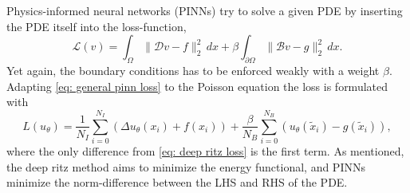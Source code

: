 Physics-informed neural networks (PINNs) try to solve a given PDE by inserting the PDE itself into the loss-function,
\begin{equation}
    \mathcal{L}(v) =  \int_\Omega \|\mathcal{D}v - f\|_2^2\, dx + \beta \int_{\partial \Omega} \|\mathcal{B}v - g\|_2^2\, dx.
    \label{eq: general pinn loss}
\end{equation}
Yet again, the boundary conditions has to be enforced weakly with a weight $\beta$. Adapting \eqref{eq: general pinn loss} to the Poisson equation the loss is formulated with
\begin{equation}
    L(u_\theta) = \frac{1}{N_I}\sum^{N_I}_{i=0}\left( \Delta u_\theta(x_i) + f(x_i)\right) + \frac{\beta}{N_B}\sum_{i=0}^{N_B}\left(u_\theta(\tilde x_i)-g(\tilde x_i)\right),
    \label{eq: pinn poisson loss}
\end{equation}
where the only difference from \eqref{eq: deep ritz loss} is the first term. As mentioned, the deep ritz method aims to minimize the energy functional, and PINNs minimize the norm-difference between the LHS and RHS of the PDE.